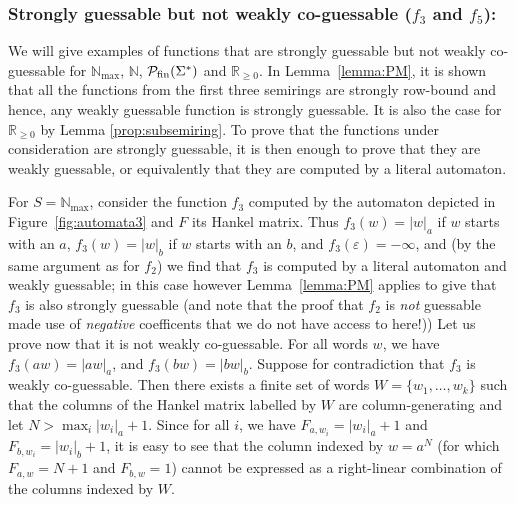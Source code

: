 \documentclass{lmcs}
\numberwithin{theorem}{section}
\begin{document}
	\subsubsection*{\textbf{Strongly guessable but not weakly co-guessable ($f_3$ and $f_5$):}}
    \label{app:examplef3}
	We will give examples of functions that are strongly guessable but not weakly co-guessable for $\mathbb{N}_{\max}$, $\mathbb{N}$, $\mathcal{P}_{\rm fin}(\Sigma^*)$ and $\mathbb{R}_{\geq 0}$. In Lemma~\ref{lemma:PM}, it is shown that all the functions from the first three semirings are strongly row-bound and hence, any weakly guessable function is strongly guessable. It is also the case for $\mathbb{R}_{\geq 0}$ by Lemma \ref{prop:subsemiring}. To prove that the functions under consideration are strongly guessable, it is then enough to prove that they are weakly guessable, or equivalently that they are computed by a literal automaton. 
	
	For  $S=\mathbb{N}_{\max}$, consider the function $f_3$ computed by the automaton depicted in Figure~\ref{fig:automata3} and $F$ its Hankel matrix. Thus $f_3(w) = |w|_a$ if $w$ starts with an $a$, $f_3(w) = |w|_b$ if $w$ starts with an $b$, and $f_3(\varepsilon) = -\infty$, and (by the same argument as for $f_2$) we find that $f_3$ is computed by a literal automaton and weakly guessable; in this case however Lemma~\ref{lemma:PM}  applies to give that $f_3$ is also strongly guessable (and note that the proof that $f_2$ is \emph{not} guessable made use of \emph{negative} coefficents that we do not have access to here!)) Let us prove now that it is not weakly co-guessable. For all words $w$, we have $f_3(aw) = |aw|_a$, and $f_3(bw) = |bw|_b$. Suppose for contradiction that $f_3$ is weakly co-guessable. Then there exists a finite set of words $W=\{w_1, \ldots ,w_k\}$ such that the columns of the Hankel matrix labelled by $W$ are column-generating and let $N> \max_i|w_i|_a + 1$. Since for all $i$, we have $F_{a, w_i} = |w_i|_a + 1$ and $F_{b, w_i} = |w_i|_b+1$, it is easy to see that the column indexed by $w = a^N$ (for which $F_{a, w} = N+1$ and $F_{b, w} = 1$) cannot be expressed as a right-linear combination of the columns indexed by $W$.
	
\end{document}
